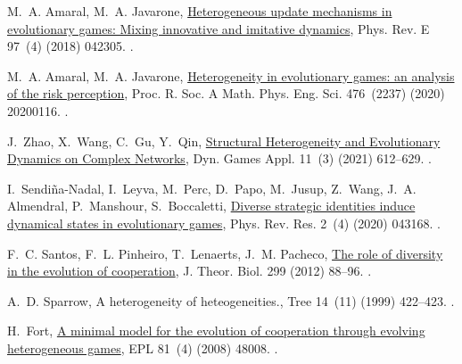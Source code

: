 \documentclass[5p,review]{elsarticle}
\begin{document}
\begin{thebibliography}{10}
M.~A. Amaral, M.~A. Javarone,
  \href{https://journals.aps.org/pre/abstract/10.1103/PhysRevE.97.042305
  https://link.aps.org/doi/10.1103/PhysRevE.97.042305}{{Heterogeneous update
  mechanisms in evolutionary games: Mixing innovative and imitative dynamics}},
  Phys. Rev. E 97~(4) (2018) 042305.
\newblock \href {http://dx.doi.org/10.1103/PhysRevE.97.042305}
  {}.

M.~A. Amaral, M.~A. Javarone, \href{https://royalsocietypublishing.org/doi/10.1098/rspa.2020.0116}{{Heterogeneity in evolutionary games: an analysis of the risk perception}}, Proc. R. Soc. A Math. Phys. Eng. Sci. 476~(2237) (2020) 20200116.
\newblock\href {http://dx.doi.org/10.1098/rspa.2020.0116}
  {}.

J.~Zhao, X.~Wang, C.~Gu, Y.~Qin,
  \href{https://doi.org/10.1007/s13235-020-00365-w}{{Structural
  Heterogeneity and Evolutionary Dynamics on Complex Networks}}, Dyn. Games
  Appl. 11~(3) (2021) 612--629.
\newblock \href {http://dx.doi.org/10.1007/s13235-020-00365-w}
  {}.

I.~Sendi{\~{n}}a-Nadal, I.~Leyva, M.~Perc, D.~Papo, M.~Jusup, Z.~Wang, J.~A.
  Almendral, P.~Manshour, S.~Boccaletti, \href{http://arxiv.org/abs/2006.09798
  https://link.aps.org/doi/10.1103/PhysRevResearch.2.043168}{{Diverse strategic identities induce dynamical states in evolutionary games}}, Phys. Rev. Res.  2~(4) (2020) 043168.
\newblock \href {http://dx.doi.org/10.1103/PhysRevResearch.2.043168}
  {}.

F.~C. Santos, F.~L. Pinheiro, T.~Lenaerts, J.~M. Pacheco,
  \href{http://linkinghub.elsevier.com/retrieve/pii/S0022519311004590}{{The
  role of diversity in the evolution of cooperation}}, J. Theor. Biol. 299
  (2012) 88--96.
\newblock \href {http://dx.doi.org/10.1016/j.jtbi.2011.09.003}
  {}.

A.~D. Sparrow, {A heterogeneity of heteogeneities.}, Tree 14~(11) (1999)
  422--423.
\newblock \href {http://doi.org/10.1016/s0169-5347(99)01735-8}
  {}.

H.~Fort,
  \href{http://stacks.iop.org/0295-5075/81/i=4/a=48008?key=crossref.ac041cb92b868718e5adf1a0b8f6709a}{{A
  minimal model for the evolution of cooperation through evolving heterogeneous
  games}}, EPL 81~(4) (2008) 48008.
\newblock \href {http://dx.doi.org/10.1209/0295-5075/81/48008}
  {}.


\end{thebibliography}
\end{document}
